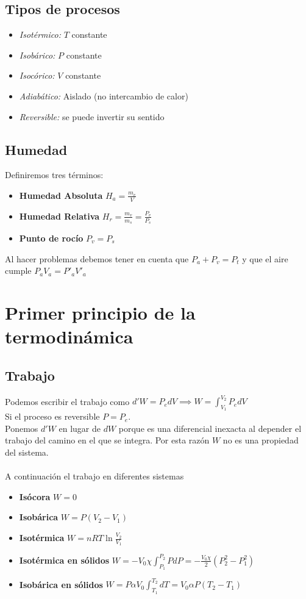 \documentclass{myclass}
\begin{document}
\subsection{Tipos de procesos}
\begin{itemize}
    \item \textit{Isotérmico:} $T$ constante
    \item \textit{Isobárico:} $P$ constante
    \item \textit{Isocórico:} $V$ constante
    \item \textit{Adiabático:} Aislado (no intercambio de calor)
    \item \textit{Reversible:} se puede invertir su sentido
\end{itemize}



\subsection{Humedad}
Definiremos tres términos:
\begin{itemize}
    \item \textbf{Humedad Absoluta} $H_a = \frac{m_v}{V}$
    \item \textbf{Humedad Relativa} $H_r=\frac{m_v}{m_s} = \frac{P_v}{P_s}$
    \item \textbf{Punto de rocío} $P_v=P_s$
\end{itemize}
Al hacer problemas debemos tener en cuenta que $P_a + P_v = P_t$ y que el aire cumple $P_aV_a = P'_aV'_a$

\section{Primer principio de la termodinámica}
\subsection{Trabajo}
Podemos escribir el trabajo como $\boxed{d'W = P_edV} \implies W = \int_{V_1}^{V_2}P_edV$ \\
Si el proceso es reversible $P = P_e$. \\
Ponemos $d'W$ en lugar de $dW$ porque es una diferencial inexacta al depender el trabajo del camino en el que se integra. Por esta razón $W$ no es una propiedad del sistema. \\
\\
A continuación el trabajo en diferentes sistemas
\begin{itemize}
    \item \textbf{Isócora} $W = 0$
    \item \textbf{Isobárica} $W = P(V_2-V_1)$
    \item \textbf{Isotérmica} $W = nRT\ln{\frac{V_2}{V_1}}$
    \item \textbf{Isotérmica en sólidos} $W = -V_0\chi\int_{P_1}^{P_2}PdP = -\frac{V_0\chi}{2}(P_2^2-P_1^2)$
    \item \textbf{Isobárica en sólidos} $W = P\alpha V_0\int_{T_1}^{T_2}dT = V_0\alpha P (T_2-T_1)$
\end{itemize}
\end{document}

